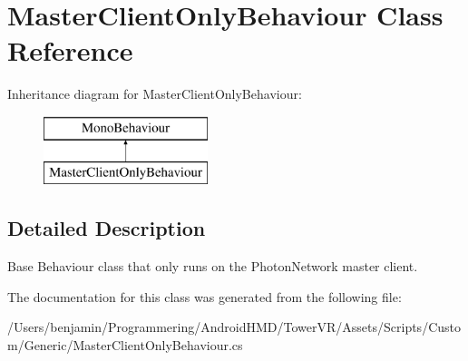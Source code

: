 \hypertarget{class_master_client_only_behaviour}{}\section{Master\+Client\+Only\+Behaviour Class Reference}
\label{class_master_client_only_behaviour}
Inheritance diagram for Master\+Client\+Only\+Behaviour\+:\begin{figure}[H]
\begin{center}
\leavevmode
\includegraphics[height=2.000000cm]{class_master_client_only_behaviour}
\end{center}
\end{figure}


\subsection{Detailed Description}
Base Behaviour class that only runs on the Photon\+Network master client. 

The documentation for this class was generated from the following file\+:\begin{DoxyCompactItemize}
\item 
/\+Users/benjamin/\+Programmering/\+Android\+H\+M\+D/\+Tower\+V\+R/\+Assets/\+Scripts/\+Custom/\+Generic/Master\+Client\+Only\+Behaviour.\+cs\end{DoxyCompactItemize}

